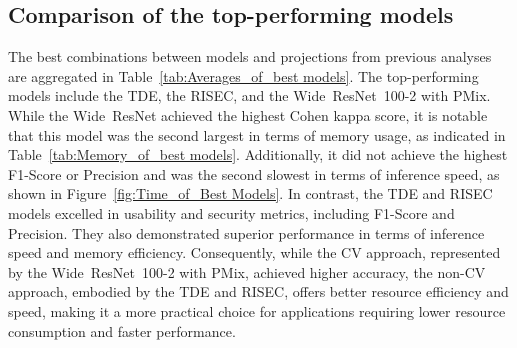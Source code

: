 





\FloatBarrier

\subsection{Comparison of the top-performing models}


The best combinations between models and projections from previous analyses are aggregated in Table~\ref{tab:Averages_of_best models}. The top-performing models include the \gls{TDE}, the \gls{RISEC}, and the \mbox{Wide ResNet 100-2} with \gls{PMix}. While the \mbox{Wide ResNet} achieved the highest Cohen kappa score, it is notable that this model was the second largest in terms of memory usage, as indicated in Table~\ref{tab:Memory_of_best models}. Additionally, it did not achieve the highest F1-Score or Precision and was the second slowest in terms of inference speed, as shown in Figure~\ref{fig:Time_of_Best Models}. In contrast, the \gls{TDE} and \gls{RISEC} models excelled in usability and security metrics, including F1-Score and Precision. They also demonstrated superior performance in terms of inference speed and memory efficiency. Consequently, while the \gls{CV} approach, represented by the \mbox{Wide ResNet 100-2} with \gls{PMix}, achieved higher accuracy, the non-\gls{CV} approach, embodied by the \gls{TDE} and \gls{RISEC}, offers better resource efficiency and speed, making it a more practical choice for applications requiring lower resource consumption and faster performance.


